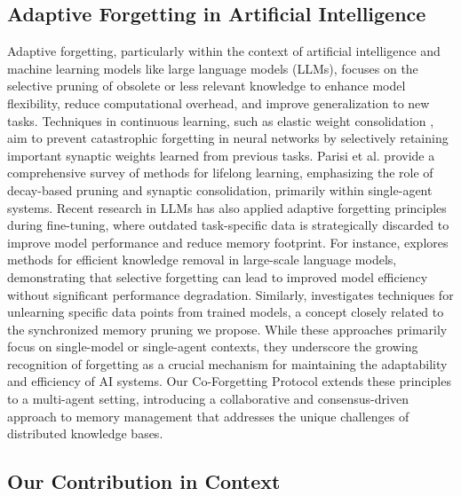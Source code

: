 \documentclass[conference]{IEEEtran}
\begin{document}
\subsection{Adaptive Forgetting in Artificial Intelligence}

Adaptive forgetting, particularly within the context of artificial intelligence and machine learning models like large language models (LLMs), focuses on the selective pruning of obsolete or less relevant knowledge to enhance model flexibility, reduce computational overhead, and improve generalization to new tasks. Techniques in continuous learning, such as elastic weight consolidation \cite{Kirkpatrick2017}, aim to prevent catastrophic forgetting in neural networks by selectively retaining important synaptic weights learned from previous tasks. Parisi et al. \cite{Parisi2019} provide a comprehensive survey of methods for lifelong learning, emphasizing the role of decay-based pruning and synaptic consolidation, primarily within single-agent systems. Recent research in LLMs has also applied adaptive forgetting principles during fine-tuning, where outdated task-specific data is strategically discarded to improve model performance and reduce memory footprint. For instance, \cite{Li2021} explores methods for efficient knowledge removal in large-scale language models, demonstrating that selective forgetting can lead to improved model efficiency without significant performance degradation. Similarly, \cite{Chen2022} investigates techniques for unlearning specific data points from trained models, a concept closely related to the synchronized memory pruning we propose. While these approaches primarily focus on single-model or single-agent contexts, they underscore the growing recognition of forgetting as a crucial mechanism for maintaining the adaptability and efficiency of AI systems. Our Co-Forgetting Protocol extends these principles to a multi-agent setting, introducing a collaborative and consensus-driven approach to memory management that addresses the unique challenges of distributed knowledge bases.

\subsection{Our Contribution in Context}
\end{document}
